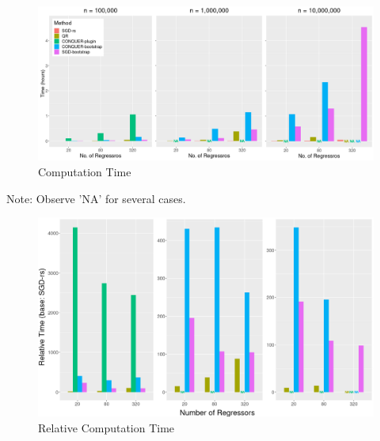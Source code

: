\documentclass[beamer, t]{beamer}
\begin{document}
\begin{frame}
	\begin{figure}[!htbp]
		\caption{Computation Time} \label{fig:time}
		\centering
		\vskip10pt
		\includegraphics[width=\textwidth]{figures/fig_time.png}
	\end{figure}

Note: Observe 'NA' for several cases.
	
\end{frame}
\begin{frame}
	\begin{figure}[!htbp]
		\caption{Relative Computation Time} \label{fig:time}
		\centering
		\vskip10pt
		\includegraphics[width=\textwidth]{figures/fig_rel_time.png}
	\end{figure}
	
\end{frame}
\end{document}
